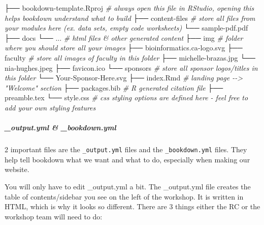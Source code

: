 \documentclass[
]{book}
\newenvironment{Shaded}{\begin{snugshade}}{\end{snugshade}}
\newcommand{\CommentTok}[1]{\textcolor[rgb]{0.56,0.35,0.01}{\textit{#1}}}
\newcommand{\ExtensionTok}[1]{#1}
\newcommand{\NormalTok}[1]{#1}
\theoremstyle{definition}
\theoremstyle{definition}
\theoremstyle{definition}
\theoremstyle{definition}
\theoremstyle{remark}
\begin{document}
\begin{Shaded}
\begin{Highlighting}[]
\ExtensionTok{├──}\NormalTok{ bookdown{-}template.Rproj }\CommentTok{\# always open this file in RStudio, opening this helps bookdown understand what to build}
\ExtensionTok{├──}\NormalTok{ content{-}files }\CommentTok{\# store all files from your modules here (ex. data sets, empty code worksheets)}
    \ExtensionTok{└──}\NormalTok{ sample{-}pdf.pdf}
\ExtensionTok{├──}\NormalTok{ docs}
    \ExtensionTok{└──}\NormalTok{ ... }\CommentTok{\# html files \& other generated content}
\ExtensionTok{├──}\NormalTok{ img }\CommentTok{\# folder where you should store all your images}
    \ExtensionTok{├──}\NormalTok{ bioinformatics.ca{-}logo.svg }
    \ExtensionTok{├──}\NormalTok{ faculty }\CommentTok{\# store all images of faculty in this folder}
        \ExtensionTok{├──}\NormalTok{ michelle{-}brazas.jpg}
        \ExtensionTok{└──}\NormalTok{ nia{-}hughes.jpeg}
    \ExtensionTok{├──}\NormalTok{ favicon.ico}
    \ExtensionTok{└──}\NormalTok{ sponsors }\CommentTok{\# store all sponsor logos/titles in this folder}
         \ExtensionTok{└──}\NormalTok{ Your{-}Sponsor{-}Here.svg}
\ExtensionTok{├──}\NormalTok{ index.Rmd }\CommentTok{\# landing page {-}{-}\textgreater{} "Welcome" section}
\ExtensionTok{├──}\NormalTok{ packages.bib }\CommentTok{\# R generated citation file}
\ExtensionTok{├──}\NormalTok{ preamble.tex}
\ExtensionTok{└──}\NormalTok{ style.css }\CommentTok{\# css styling options are defined here {-} feel free to add your own styling features}
\end{Highlighting}
\end{Shaded}

\subparagraph*{\texorpdfstring{ \_output.yml \& \_bookdown.yml }{ \_output.yml \& \_bookdown.yml }}\label{output.yml-_bookdown.yml}

2 important files are the \texttt{\_output.yml} files and the \texttt{\_bookdown.yml} files. They help tell bookdown what we want and what to do, especially when making our website.

You will only have to edit \_output.yml a bit. The \_output.yml file creates the table of contents/sidebar you see on the left of the workshop. It is written in HTML, which is why it looks so different. There are 3 things either the RC or the workshop team will need to do:
\end{document}
